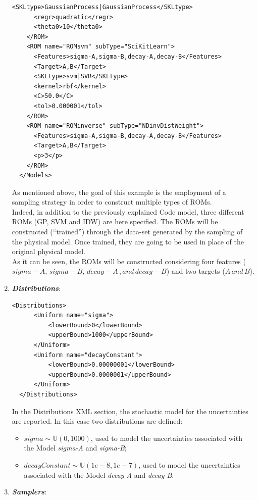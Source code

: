 \begin{enumerate}
\begin{lstlisting}[style=XML,morekeywords={arg,extension,pauseAtEnd,overwrite}]
      <SKLtype>GaussianProcess|GaussianProcess</SKLtype>
      <regr>quadratic</regr>
      <theta0>10</theta0>
    </ROM>
    <ROM name="ROMsvm" subType="SciKitLearn">
      <Features>sigma-A,sigma-B,decay-A,decay-B</Features>
      <Target>A,B</Target>
      <SKLtype>svm|SVR</SKLtype>
      <kernel>rbf</kernel>
      <C>50.0</C>
      <tol>0.000001</tol>
    </ROM>
    <ROM name="ROMinverse" subType="NDinvDistWeight">
      <Features>sigma-A,sigma-B,decay-A,decay-B</Features>
      <Target>A,B</Target>
      <p>3</p>
    </ROM>
  </Models>
\end{lstlisting}
 As mentioned above, the goal of this example is the employment of
 a sampling strategy in order to construct multiple types of ROMs.
 \\Indeed, in addition to the previously explained Code
 model,
 three different ROMs (GP, SVM and IDW) are here specified. The ROMs will be
 constructed (``trained'') through the data-set generated by the sampling of the physical model. Once trained, they are going
 to be used in place of the original physical model.
 \\As it can be seen,
 the ROMs will be constructed considering four features ($sigma-A,\,sigma-B,\, decay-A \,,and \, decay-B$) and two targets
 ($A \, and \, B$).
   \item \textbf{\textit{Distributions}}:
\begin{lstlisting}[style=XML]
  <Distributions>
      <Uniform name="sigma">
          <lowerBound>0</lowerBound>
          <upperBound>1000</upperBound>
      </Uniform>
      <Uniform name="decayConstant">
          <lowerBound>0.00000001</lowerBound>
          <upperBound>0.0000001</upperBound>
      </Uniform>
  </Distributions>
\end{lstlisting}
  In the Distributions XML section, the stochastic model for the
  uncertainties are reported. In
  this case two distributions are defined:
  \begin{itemize}
    \item $sigma \sim \mathbb{U}(0,1000)$, used to model the uncertainties
    associated with  the Model \textit{sigma-A} and \textit{sigma-B};
    \item  $decayConstant \sim \mathbb{U}(1e-8,1e-7)$,  used to
    model the uncertainties
    associated with  the Model \textit{decay-A} and \textit{decay-B}.
  \end{itemize}
   \item \textbf{\textit{Samplers}}:
\begin{lstlisting}[style=XML,morekeywords={arg,extension,pauseAtEnd,overwrite}]

\end{lstlisting}
\end{enumerate}
